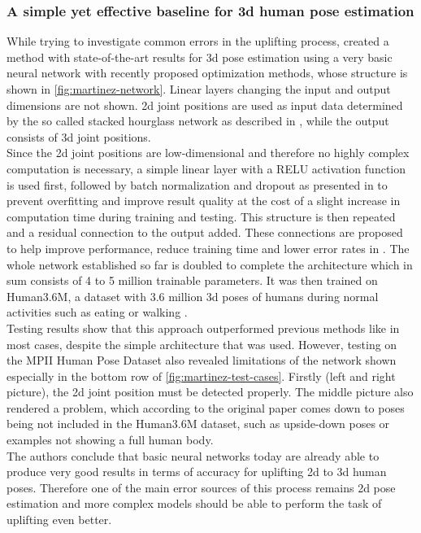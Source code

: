 \subsubsection{A simple yet effective baseline for 3d human pose estimation}
\label{simple-yet-effective-baseline}
While trying to investigate common errors in the uplifting process, \cite{Martinez_2017_ICCV} created a method with state-of-the-art results for 3d pose estimation using a very basic neural network with recently proposed optimization methods, whose structure is shown in \autoref{fig:martinez-network}. Linear layers changing the input and output dimensions are not shown. 2d joint positions are used as input data determined by the so called stacked hourglass network as described in \cite{Newell2016}, while the output consists of 3d joint positions.\\
 Since the 2d joint positions are low-dimensional and therefore no highly complex computation is necessary, a simple linear layer with a RELU activation function is used first, followed by batch normalization and dropout as presented in \cite{srivastava2014} to prevent overfitting and improve result quality at the cost of a slight increase in computation time during training and testing. This structure is then repeated and a residual connection to the output added. These connections are proposed to help improve performance, reduce training time and lower error rates in \cite{HeZRS15}. The whole network established so far is doubled to complete the architecture which in sum consists of 4 to 5 million trainable parameters. It was then trained on Human3.6M, a dataset with 3.6 million 3d poses of humans during normal activities such as eating or walking \cite{H3.6M}.\\ Testing results show that this approach outperformed previous methods like \cite{PavlakosZDD16} in most cases, despite the simple architecture that was used. However, testing on the MPII Human Pose Dataset \cite{andriluka14cvpr} also revealed limitations of the network shown especially in the bottom row of \autoref{fig:martinez-test-cases}. Firstly (left and right picture), the 2d joint position must be detected properly. The middle picture also rendered a problem, which according to the original paper comes down to poses being not included in the Human3.6M dataset, such as upside-down poses or examples not showing a full human body.\\
 The authors conclude that basic neural networks today are already able to produce very good results in terms of accuracy for uplifting 2d to 3d human poses. Therefore one of the main error sources of this process remains 2d pose estimation and more complex models should be able to perform the task of uplifting even better.
 
